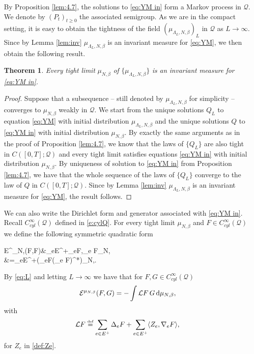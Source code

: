 \documentclass[11pt,UTF-8,reqno]{amsart}
\numberwithin{equation}{section}
\newtheorem{theorem}{Theorem}[section]
\def\<{{\langle}}
\def\>{{\rangle}}
\def\tr{\mathrm {tr}}
\def\dif{{\mathord{{\rm d}}}}
\newcommand{\eqdef}{\stackrel{\mbox{\tiny def}}{=}}
\def\cE{{\mathcal E}}
\def\cL{{\mathcal L}}
\def\cQ{{\mathcal Q}}
\def\mN{{\mathbb N}}
\def\geq{\geqslant}
\def\<{{\langle}}
\def\>{{\rangle}}
\def\tr{\mathrm {tr}}
\def\dif{{\mathord{{\rm d}}}}
\def\tr{{\rm Tr}}
\def\bt{\begin{theorem}}
\def\et{\end{theorem}}
\def\geq{\geqslant}
\def\<{\langle} \def\>{\rangle}
\begin{document}
By Proposition \ref{lem:4.7}, the solutions to \eqref{eq:YM in} form a Markov process in $\cQ$.
We denote by $(P_t)_{t\geq0}$ the associated semigroup.
 As we are in the compact setting, it is easy to obtain the tightness of the field  $(\mu_{\Lambda_{L},N,\beta})_L$ in $\cQ$ as $L\to \infty$. Since by Lemma \ref{lem:inv} $\mu_{\Lambda_{L},N,\beta}$ is an invariant measure for \eqref{eq:YM}, we then obtain the following result.


\bt\label{th:in1} Every tight limit $\mu_{N,\beta}$ of $\{\mu_{\Lambda_{L},N,\beta}\}$ is an invariant measure for \eqref{eq:YM in}.
\et

\begin{proof}
Suppose that a subsequence -- still denoted by $\mu_{\Lambda_{L},N,\beta}$ for simplicity -- converges to $\mu_{N,\beta}$ weakly in $\cQ$.
	We start from the unique solutions $Q_L$ to equation \eqref{eq:YM} with initial distribution $\mu_{\Lambda_{L},N,\beta}$ and the unique solutions $Q$ to \eqref{eq:YM in}  with initial distribution $\mu_{N,\beta}$.
	By exactly the same arguments as in the proof of Proposition \ref{lem:4.7}, we know that the laws of $\{Q_L\}$ are also tight in $C([0,T];\cQ)$ and every tight limit satisfies equations \eqref{eq:YM in}  with initial distribution $\mu_{N,\beta}$.
	By  uniqueness of solution to \eqref{eq:YM in}  from Proposition \ref{lem:4.7},
	we have that the whole sequence of the laws of $\{Q_L\}$ converge to the law of $Q$ in $C([0,T];\cQ)$. Since by Lemma \ref{lem:inv} $\mu_{\Lambda_{L},N,\beta}$ is an invariant measure for \eqref{eq:YM}, the result follows.
\end{proof}

We can also write the Dirichlet form and generator associated with \eqref{eq:YM in}. 
Recall $ C^\infty_{cyl}(\cQ)$ defined in \eqref{e:cylQ}.
For every tight limit $\mu_{N,\beta}$ and $F\in C^\infty_{cyl}(\cQ)$ we define
the following  symmetric quadratic form
\begin{equs}[e:EFF]
	\cE^{\mu_{N,\beta}}(F,F)&\eqdef\sum_{e\in E^+}\int\<\nabla_{e}F,\nabla_{e} F\>\dif \mu_{N,\beta}
	\\
	&=\sum_{e\in E^+}\int\tr(\nabla_{e}F(\nabla_{e} F)^*)\dif \mu_{N,\beta}.
\end{equs}
By \eqref{eq:L} and letting $L\to\infty$ we have that for $F, G\in C^\infty_{cyl}(\cQ)$
\begin{align}\label{eq:E}
	\cE^{\mu_{N,\beta}}(F,G)=-\int \cL F\, G\, \dif \mu_{N,\beta},
\end{align}
with
\begin{align*}
	\cL F\eqdef\sum_{e\in E^+}\Delta_{e}F+\sum_{e\in E^+}\<Z_e,\nabla_{e} F\>,
\end{align*}
for $Z_e$ in \eqref{def:Ze}. 
\end{document}
